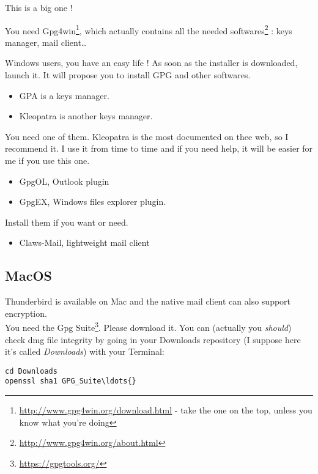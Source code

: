 This is a big one !

You need Gpg4win\footnote{\url{http://www.gpg4win.org/download.html} - take the
one on the top, unless you know what you're doing}, which
actually contains all the needed softwares\footnote{\url{http://www.gpg4win.org/about.html}} : keys manager, mail client\ldots{}

Windows users, you have an easy life ! As soon as the installer is downloaded, launch it. It will propose you to install GPG and other softwares.

\begin{itemize}
\itemsep1pt\parskip0pt
\item
  GPA is a keys manager.
\item
  Kleopatra is another keys manager.
\end{itemize}

You need one of them. Kleopatra is the most documented on thee web, so I
recommend it. I use it from time to time and if you need help, it will
be easier for me if you use this one.

\begin{itemize}
\item GpgOL, Outlook plugin
\item GpgEX, Windows files explorer plugin.
\end{itemize}

Install them if you want or need.

\begin{itemize}
\item Claws-Mail, lightweight mail client
\end{itemize}

\subsection{MacOS}\label{macos}

Thunderbird is available on Mac and the native mail client can also support encryption.\\

You need the Gpg Suite\footnote{\url{https://gpgtools.org/}}. Please download it. You can (actually you \emph{should}) check dmg file integrity by going
in your Downloads repository (I suppose here it's called
\emph{Downloads}) with your Terminal:

\begin{lstlisting}
cd Downloads
openssl sha1 GPG_Suite\ldots{}
\end{lstlisting}

